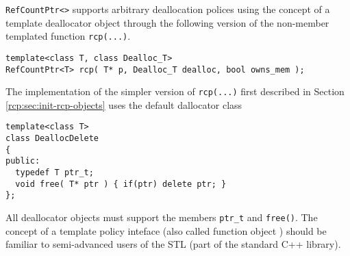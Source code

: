 {}\texttt{RefCountPtr<>} supports arbitrary deallocation polices using
the concept of a template deallocator object through the following
version of the non-member templated function {}\texttt{rcp(...)}.
%
{\scriptsize\begin{verbatim}
template<class T, class Dealloc_T>
RefCountPtr<T> rcp( T* p, Dealloc_T dealloc, bool owns_mem );
\end{verbatim}}
%
The implementation of the simpler version of {}\texttt{rcp(...)} first
described in Section {}\ref{rcp:sec:init-rcp-objects} uses the default
dallocator class
%
{\scriptsize\begin{verbatim}
template<class T>
class DeallocDelete
{
public:
  typedef T ptr_t;
  void free( T* ptr ) { if(ptr) delete ptr; }
};
\end{verbatim}}
%
All deallocator objects must support the members {}\texttt{ptr\_t} and
{}\texttt{free()}.  The concept of a template policy inteface (also
called function object \cite[Section 18.4]{ref:stroustrup_2000})
should be familiar to semi-advanced users of the STL (part of the
standard C++ library).

